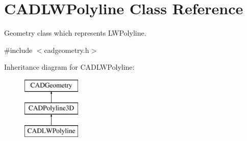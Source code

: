 \hypertarget{class_c_a_d_l_w_polyline}{}\section{C\+A\+D\+L\+W\+Polyline Class Reference}
\label{class_c_a_d_l_w_polyline}


Geometry class which represents L\+W\+Polyline.  




{\ttfamily \#include $<$cadgeometry.\+h$>$}

Inheritance diagram for C\+A\+D\+L\+W\+Polyline\+:\begin{figure}[H]
\begin{center}
\leavevmode
\includegraphics[height=3.000000cm]{class_c_a_d_l_w_polyline}
\end{center}
\end{figure}
